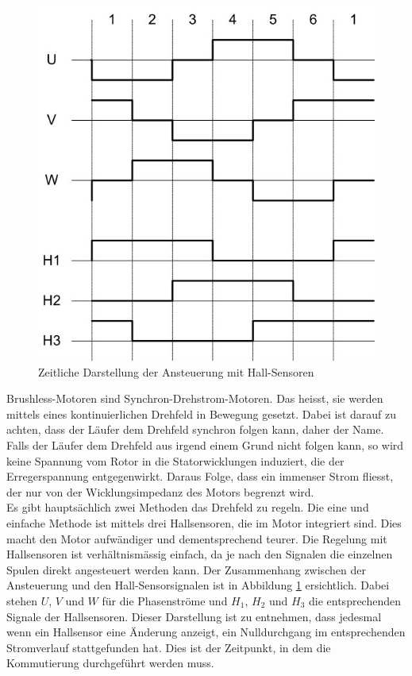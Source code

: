 \begin{figure}
	\includegraphics[scale=0.45]{Funktionstests/Bilder/ZeitlicheHallSensorAnsteuerung.jpg}
	\caption[Zeitliche Darstellung der Ansteuerung mit Hall-Sensoren]{Zeitliche Darstellung der Ansteuerung mit Hall-Sensoren \cite{AppNote:BrushlessuC}}
	\centering
    \label{abb:ZeitlicheAnsteuerungBrushlessMotor}
\end{figure}
Brushless-Motoren sind Synchron-Drehstrom-Motoren. Das heisst, sie werden mittels eines kontinuierlichen Drehfeld in Bewegung gesetzt. Dabei ist darauf zu achten, dass der Läufer dem Drehfeld synchron folgen kann, daher der Name. Falls der Läufer dem Drehfeld aus irgend einem Grund nicht folgen kann, so wird keine Spannung vom Rotor in die Statorwicklungen induziert, die der Erregerspannung entgegenwirkt. Daraus Folge, dass ein immenser Strom fliesst, der nur von der Wicklungsimpedanz des Motors begrenzt wird.\\
Es gibt hauptsächlich zwei Methoden das Drehfeld zu regeln. Die eine und einfache Methode ist mittels drei Hallsensoren, die im Motor integriert sind. Dies macht den Motor aufwändiger und dementsprechend teurer. Die Regelung mit Hallsensoren ist verhältnismässig einfach, da je nach den Signalen die einzelnen Spulen direkt angesteuert werden kann. Der Zusammenhang zwischen der Ansteuerung und den Hall-Sensorsignalen ist in Abbildung \ref{abb:ZeitlicheAnsteuerungBrushlessMotor} ersichtlich. Dabei stehen $U$, $V$ und $W$ für die Phasenströme und $H_1$, $H_2$ und $H_3$ die entsprechenden Signale der Hallsensoren. Dieser Darstellung ist zu entnehmen, dass jedesmal wenn ein Hallsensor eine Änderung anzeigt, ein Nulldurchgang im entsprechenden Stromverlauf stattgefunden hat. Dies ist der Zeitpunkt, in dem die Kommutierung durchgeführt werden muss.
